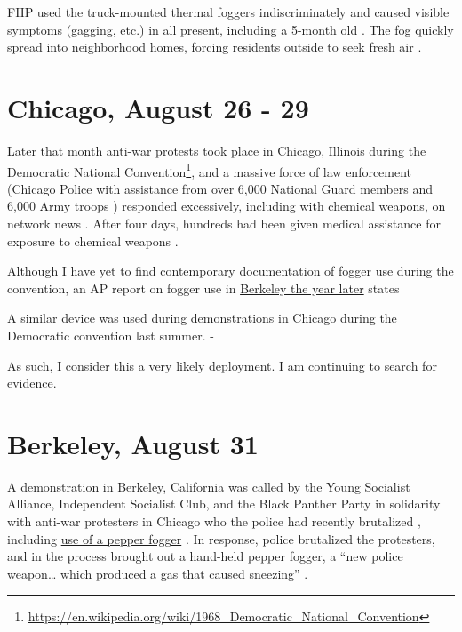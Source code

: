 \documentclass[
  11pt,
  titlepage]{krantz}
\renewenvironment{quote}{\begin{VF}}{\end{VF}}
\renewcommand{\href}[2]{#2\footnote{\url{#1}}}
\begin{document}
FHP used the truck-mounted thermal foggers indiscriminately and caused visible symptoms (gagging, etc.) in all present, including a 5-month old \citep{McArdle2018}.
The fog quickly spread into neighborhood homes, forcing residents outside to seek fresh air \citep{Tschenschlok1995}.

\hypertarget{ChicagoIL1968_08_26}{%
\section*{Chicago, August 26 - 29}\label{ChicagoIL1968_08_26}}


Later that month anti-war protests took place in Chicago, Illinois during the \href{https://en.wikipedia.org/wiki/1968_Democratic_National_Convention}{Democratic National Convention}, and a massive force of law enforcement (Chicago Police with assistance from over 6,000 National Guard members and 6,000 Army troops \citep{TaylorandMorris2018}) responded excessively, including with chemical weapons, on network news \citep{Schultz1969, Karnow1983, Farber1988, Langguth2000}.
After four days, hundreds had been given medical assistance for exposure to chemical weapons \citep{TaylorandMorris2018}.

Although I have yet to find contemporary documentation of fogger use during the convention, an AP report on fogger use in \protect\hyperlink{BerkeleyCA1969_02_21}{Berkeley the year later} states

\begin{quote}
A similar device was used during demonstrations in Chicago during the Democratic convention last summer. - \citet{TheDailyTribune1969_02_21}
\end{quote}

As such, I consider this a very likely deployment.
I am continuing to search for evidence.

\hypertarget{BerkeleyCA1968_08_31}{%
\section*{Berkeley, August 31}\label{BerkeleyCA1968_08_31}}


A demonstration in Berkeley, California was called by the Young Socialist Alliance, Independent Socialist Club, and the Black Panther Party in solidarity with anti-war protesters in Chicago who the police had recently brutalized \citep{PatersonEveningNews1968_08_31, TheCapitalTimes1968_08_31}, including \protect\hyperlink{ChicagoIL1968_08_26}{use of a pepper fogger} \citep{TheDailyTribune1969_02_21}.
In response, police brutalized the protesters, and in the process brought out a hand-held pepper fogger, a ``new police weapon\ldots{} which produced a gas that caused sneezing'' \citep{PatersonEveningNews1968_08_31}.
\end{document}
